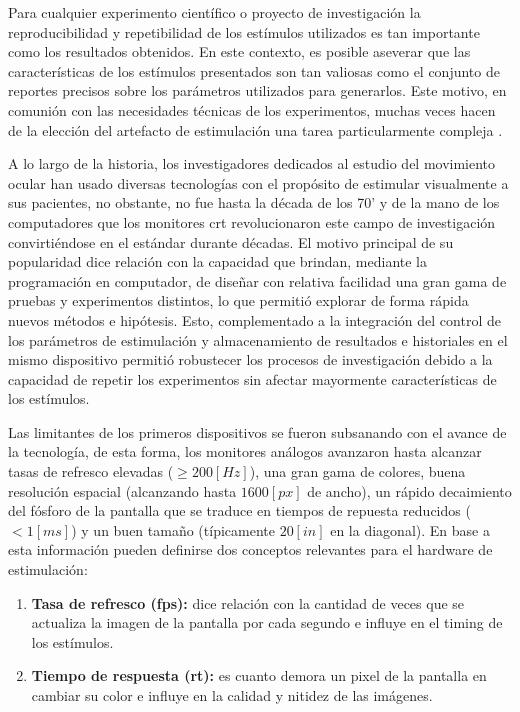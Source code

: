 \documentclass[../main.tex]{subfiles}
\begin{document}
			Para cualquier experimento científico o proyecto de investigación la reproducibilidad y repetibilidad de los estímulos utilizados es tan importante como los resultados obtenidos. En este contexto, es posible aseverar que las características de los estímulos presentados son tan valiosas como el conjunto de reportes precisos sobre los parámetros utilizados para generarlos. Este motivo, en comunión con las necesidades técnicas de los experimentos, muchas veces hacen de la elección del artefacto de estimulación una tarea particularmente compleja \cite{article:monitor_beuer}.

			A lo largo de la historia, los investigadores dedicados al estudio del movimiento ocular han usado diversas tecnologías con el propósito de estimular visualmente a sus pacientes, no obstante, no fue hasta la década de los 70' y de la mano de los computadores que los monitores \acrshort{crt} revolucionaron este campo de investigación convirtiéndose en el estándar durante décadas. El motivo principal de su popularidad dice relación con la capacidad que brindan, mediante la programación en computador, de diseñar con relativa facilidad una gran gama de pruebas y experimentos distintos, lo que permitió explorar de forma rápida nuevos métodos e hipótesis. Esto, complementado a la integración del control de los parámetros de estimulación y almacenamiento de resultados e historiales en el mismo dispositivo permitió robustecer los procesos de investigación debido a la capacidad de repetir los experimentos sin afectar mayormente características de los estímulos. 

			Las limitantes de los primeros dispositivos se fueron subsanando con el avance de la tecnología, de esta forma, los monitores análogos avanzaron hasta alcanzar tasas de refresco elevadas ($\geq 200[Hz]$), una gran gama de colores, buena resolución espacial (alcanzando hasta $1600[px]$ de ancho), un rápido decaimiento del fósforo de la pantalla que se traduce en tiempos de repuesta reducidos ($< 1[ms]$) y un buen tamaño (típicamente $20[in]$ en la diagonal). En base a esta información pueden definirse dos conceptos relevantes para el hardware de estimulación: 
			\begin{enumerate}
				\item \textbf{Tasa de refresco (\acrshort{fps}):} dice relación con la cantidad de veces que se actualiza la imagen de la pantalla por cada segundo e influye en el timing de los estímulos.
				\item \textbf{Tiempo de respuesta (\acrshort{rt}):} es cuanto demora un pixel de la pantalla en cambiar su color e influye en la calidad y nitidez de las imágenes. 
			\end{enumerate}
\end{document}
